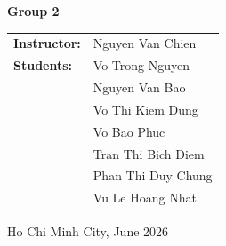 \documentclass[12pt,a4paper]{report}
\begin{document}
\begin{titlepage}
\begin{center}
			{\large\textbf{Group 2}}
			
			\vfill
			
			\begin{tabular}{ll}
				\textbf{Instructor:} & Nguyen Van Chien \\[0.5cm]
				\textbf{Students:}   & Vo Trong Nguyen \\
				& Nguyen Van Bao \\
				& Vo Thi Kiem Dung \\
				& Vo Bao Phuc \\
				& Tran Thi Bich Diem \\
				& Phan Thi Duy Chung \\
				& Vu Le Hoang Nhat \\
			\end{tabular}
			
			\vfill
			
			{\large Ho Chi Minh City, June 2026}
			
		\end{center}
	\end{titlepage}
	
\end{document}

